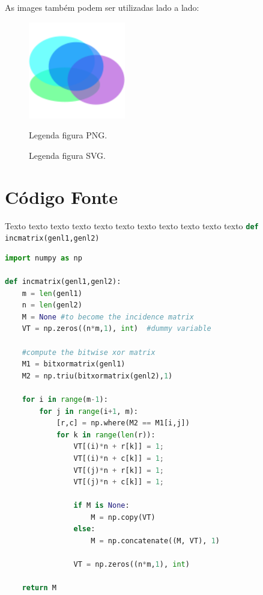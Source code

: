     As images também podem ser utilizadas lado a lado:

    \begin{figure}
        \centering
        \begin{minipage}{0.5\textwidth}
            \centering
            \includegraphics[width=120pt]{images/figure.png}
            \caption{Legenda figura PNG.}
            \label{fig:e6}
        \end{minipage}
        \begin{minipage}{0.5\textwidth}
            \centering
            \caption{Legenda figura SVG.}
            \label{fig:e7}
        \end{minipage}
    \end{figure}

\section{Código Fonte}
\label{sec:codigo}

    Texto texto texto texto texto texto texto texto texto texto texto
    \lstinline[language=Python, style=Python]|def incmatrix(genl1,genl2)|

\begin{lstlisting}[language=Python, style=Python]
import numpy as np 

def incmatrix(genl1,genl2):
    m = len(genl1)
    n = len(genl2)
    M = None #to become the incidence matrix
    VT = np.zeros((n*m,1), int)  #dummy variable
    
    #compute the bitwise xor matrix
    M1 = bitxormatrix(genl1)
    M2 = np.triu(bitxormatrix(genl2),1) 

    for i in range(m-1):
        for j in range(i+1, m):
            [r,c] = np.where(M2 == M1[i,j])
            for k in range(len(r)):
                VT[(i)*n + r[k]] = 1;
                VT[(i)*n + c[k]] = 1;
                VT[(j)*n + r[k]] = 1;
                VT[(j)*n + c[k]] = 1;
                
                if M is None:
                    M = np.copy(VT)
                else:
                    M = np.concatenate((M, VT), 1)
                
                VT = np.zeros((n*m,1), int)
    
    return M
\end{lstlisting}
